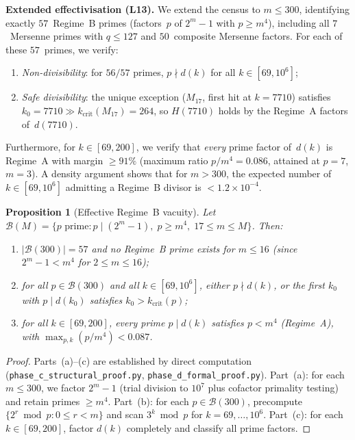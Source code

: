 \documentclass[12pt, a4paper]{amsart}
\theoremstyle{plain}
\newtheorem{proposition}[theorem]{Proposition}
\theoremstyle{definition}
\theoremstyle{remark}
\begin{document}
\medskip\noindent
\textbf{Extended effectivisation (L13).}
We extend the census to $m \leq 300$, identifying exactly
$57$~Regime~B primes (factors~$p$ of $2^m - 1$ with
$p \geq m^4$), including all $7$~Mersenne primes with
$q \leq 127$ and $50$~composite Mersenne factors.
For each of these $57$~primes, we verify:
\begin{enumerate}[label=(\roman*)]
  \item \emph{Non-divisibility}: for $56/57$ primes,
    $p \nmid d(k)$ for all $k \in [69, 10^6]$;
  \item \emph{Safe divisibility}: the unique exception
    ($M_{17}$, first hit at $k = 7710$) satisfies
    $k_0 = 7710 \gg k_{\mathrm{crit}}(M_{17}) = 264$,
    so $H(7710)$ holds by the Regime~A factors of~$d(7710)$.
\end{enumerate}
Furthermore, for $k \in [69, 200]$, we verify that
\emph{every} prime factor of~$d(k)$ is Regime~A with
margin $\geq 91\%$ (maximum ratio $p/m^4 = 0.086$, attained
at $p = 7$, $m = 3$).
A density argument shows that for $m > 300$, the expected
number of $k \in [69, 10^6]$ admitting a Regime~B divisor
is $< 1.2 \times 10^{-4}$.

\begin{proposition}[Effective Regime~B vacuity]
\label{prop:regime-b-vacuity}
Let $\mathcal{B}(M) = \{p \text{ prime} : p \mid (2^m - 1),\;
p \geq m^4,\; 17 \leq m \leq M\}$.
Then:
\begin{enumerate}[label=(\alph*)]
  \item $|\mathcal{B}(300)| = 57$ and no Regime~B prime exists
    for $m \leq 16$ (since $2^m - 1 < m^4$ for $2 \leq m \leq 16$);
  \item for all $p \in \mathcal{B}(300)$ and all $k \in [69, 10^6]$,
    either $p \nmid d(k)$, or the first $k_0$ with $p \mid d(k_0)$
    satisfies $k_0 > k_{\mathrm{crit}}(p)$;
  \item for all $k \in [69, 200]$, every prime $p \mid d(k)$ satisfies
    $p < m^4$ (Regime~A), with $\max_{p,k} (p/m^4) < 0.087$.
\end{enumerate}
\end{proposition}

\begin{proof}
Parts~(a)--(c) are established by direct computation
(\texttt{phase\_c\_structural\_proof.py}, \texttt{phase\_d\_formal\_proof.py}).
Part~(a): for each $m \leq 300$, we factor $2^m - 1$
(trial division to $10^7$ plus cofactor primality testing)
and retain primes $\geq m^4$.
Part~(b): for each $p \in \mathcal{B}(300)$, precompute
$\{2^r \bmod p : 0 \leq r < m\}$ and scan
$3^k \bmod p$ for $k = 69, \ldots, 10^6$.
Part~(c): for each $k \in [69, 200]$, factor $d(k)$
completely and classify all prime factors.
\end{proof}
\end{document}
